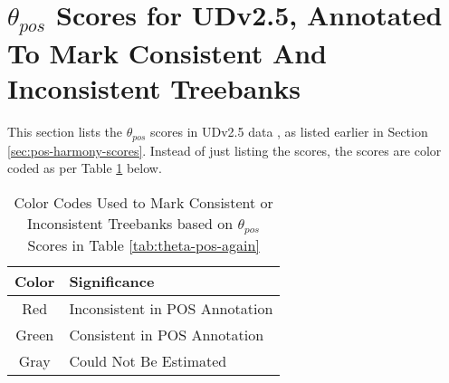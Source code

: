 \section{\texorpdfstring{$\theta_{pos}$}{theta\_pos} Scores for UDv2.5, Annotated To Mark Consistent And Inconsistent Treebanks}
\label{sec:theta_pos_annotations}

This section lists the $\theta_{pos}$ scores in UDv2.5 data \citep{UDv2.5}, as listed earlier in Section \ref{sec:pos-harmony-scores}. Instead of just listing the scores, the scores are color coded as per Table \ref{tab:color-codes} below.

\begin{table}[H]
    \centering
    \begin{tabular}{|c|l|}
        \hline
        \textbf{Color} & \textbf{Significance} \\
        \hline
        \cellcolor{red!25}Red & Inconsistent in POS Annotation\\
        \hline
        \cellcolor{green!25}Green & Consistent in POS Annotation\\
        \hline
        \cellcolor{gray!25}Gray & Could Not Be Estimated\\
        \hline
    \end{tabular}
    \caption{Color Codes Used to Mark Consistent or Inconsistent Treebanks based on $\theta_{pos}$ Scores in Table \ref{tab:theta-pos-again}}
    \label{tab:color-codes}
\end{table}

